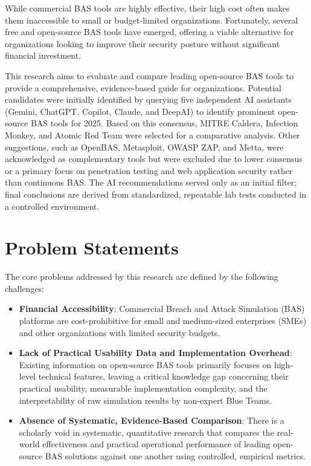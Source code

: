 While commercial BAS tools are highly effective, their high cost often makes them inaccessible to small or budget-limited organizations. Fortunately, several free and open-source BAS tools have emerged, offering a viable alternative for organizations looking to improve their security posture without significant financial investment.

This research aims to evaluate and compare leading open-source BAS tools to provide a comprehensive, evidence-based guide for organizations. Potential candidates were initially identified by querying five independent AI assistants (Gemini, ChatGPT, Copilot, Claude, and DeepAI) to identify prominent open-source BAS tools for 2025. Based on this consensus, MITRE Caldera\cite{caldera}, Infection Monkey\cite{infectionmonkey}, and Atomic Red Team\cite{atomicredteam} were selected for a comparative analysis. Other suggestions, such as OpenBAS, Metasploit, OWASP ZAP, and Metta, were acknowledged as complementary tools but were excluded due to lower consensus or a primary focus on penetration testing and web application security rather than continuous BAS. The AI recommendations served only as an initial filter; final conclusions are derived from standardized, repeatable lab tests conducted in a controlled environment.

\section{Problem Statements}\label{sec:Hypothesis}
The core problems addressed by this research are defined by the following challenges:
\begin{itemize}
    \item \textbf{Financial Accessibility}: Commercial Breach and Attack Simulation (BAS) platforms are cost-prohibitive for small and medium-sized enterprises (SMEs) and other organizations with limited security budgets.
    \item \textbf{Lack of Practical Usability Data and Implementation Overhead}: Existing information on open-source BAS tools primarily focuses on high-level technical features, leaving a critical knowledge gap concerning their practical usability, measurable implementation complexity, and the interpretability of raw simulation results by non-expert Blue Teams.
    \item \textbf{Absence of Systematic, Evidence-Based Comparison}: There is a scholarly void in systematic, quantitative research that compares the real-world effectiveness and practical operational performance of leading open-source BAS solutions against one another using controlled, empirical metrics.
\end{itemize}

